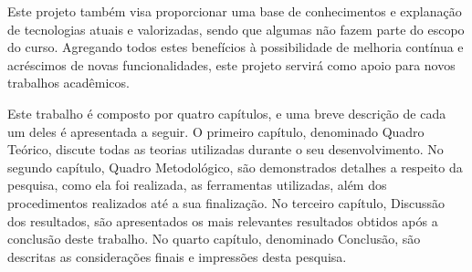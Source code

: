 \par Este projeto também visa proporcionar uma base de conhecimentos e explanação de tecnologias atuais e valorizadas, sendo que algumas não fazem parte do escopo do curso. Agregando todos estes benefícios à possibilidade de melhoria contínua e acréscimos de novas funcionalidades, este projeto servirá como apoio para novos trabalhos acadêmicos.

\par Este trabalho é composto por quatro capítulos, e uma breve descrição de cada um deles é apresentada a seguir. O primeiro capítulo, denominado Quadro Teórico, discute todas as teorias utilizadas durante o seu desenvolvimento. No segundo capítulo, Quadro Metodológico, são demonstrados detalhes a respeito da pesquisa, como ela foi realizada, as ferramentas utilizadas, além dos procedimentos realizados até a sua finalização. No terceiro capítulo, Discussão dos resultados, são apresentados os mais relevantes resultados obtidos após a conclusão deste trabalho. No quarto capítulo, denominado Conclusão, são descritas as considerações finais e impressões desta pesquisa.